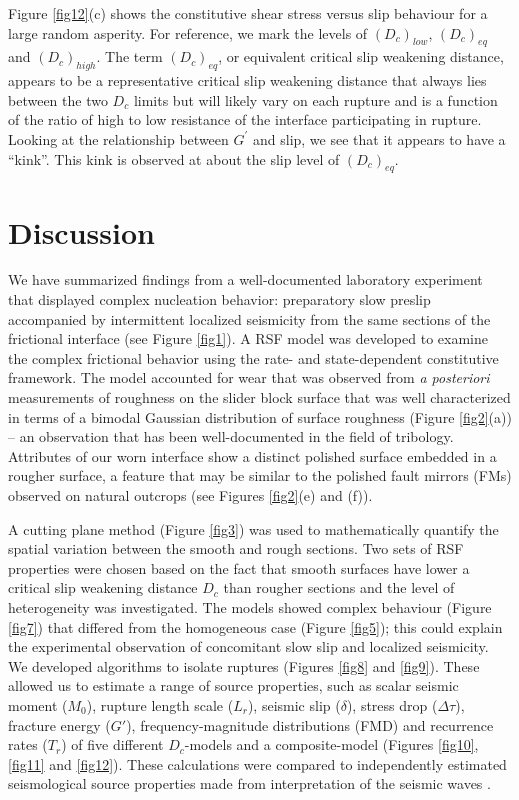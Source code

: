 \documentclass[preprint,1p, 10pt,authoryear]{elsarticle}
\begin{document}
Figure \ref{fig12}(c) shows the constitutive shear stress versus slip behaviour for a large random asperity. For reference, we mark the levels of $(D_{c})_{low}$, $(D_{c})_{eq}$ and $(D_{c})_{high}$.  The term $(D_{c})_{eq}$, or equivalent critical slip weakening distance, appears to be a representative critical slip weakening distance that always lies between the two $D_{c}$ limits but will likely vary on each rupture and is a function of the ratio of high to low resistance of the interface participating in rupture. Looking at the relationship between $G^{'}$ and slip, we see that it appears to have a ``kink''.  This kink is observed at about the slip level of  $(D_{c})_{eq}$. 

\section{Discussion}
We have summarized findings from a well-documented laboratory experiment \citep{Selvadurai2015, Selvadurai2017, Selvadurai2019} that displayed complex nucleation behavior: preparatory slow preslip accompanied by intermittent localized seismicity from the same sections of the frictional interface (see Figure \ref{fig1}). A RSF model was developed to examine the complex frictional behavior using the rate- and state-dependent constitutive framework. The model accounted for wear that was observed from \textit{a posteriori} measurements of roughness on the slider block surface that was well characterized in terms of a bimodal Gaussian distribution of surface roughness (Figure \ref{fig2}(a)) -- an observation that has been well-documented in the field of tribology. Attributes of our worn interface show a distinct polished surface embedded in a rougher surface, a feature that may be similar to the polished fault mirrors (FMs) observed on natural outcrops (see Figures \ref{fig2}(e) and (f)).

A cutting plane method (Figure \ref{fig3}) was used to mathematically quantify the spatial variation between the smooth and rough sections. Two sets of RSF properties were chosen based on the fact that smooth surfaces have lower a critical slip weakening distance $D_{c}$ than rougher sections and the level of heterogeneity was investigated. The models showed complex behaviour (Figure \ref{fig7}) that differed from the homogeneous case (Figure \ref{fig5}); this could explain the experimental observation of concomitant slow slip and localized seismicity.  We developed algorithms to isolate ruptures (Figures \ref{fig8} and \ref{fig9}).  These allowed us to estimate a range of source properties, such as scalar seismic moment ($M_{0}$), rupture length scale ($L_{r}$), seismic slip ($\delta$), stress drop ($\Delta\tau$), fracture energy ($G'$), frequency-magnitude distributions (FMD) and recurrence rates ($T_{r}$) of five different $D_{c}$-models and a composite-model (Figures \ref{fig10}, \ref{fig11} and \ref{fig12}). These calculations were compared to independently estimated seismological source properties made from interpretation of the seismic waves \citep{Selvadurai2019}.
\end{document}
